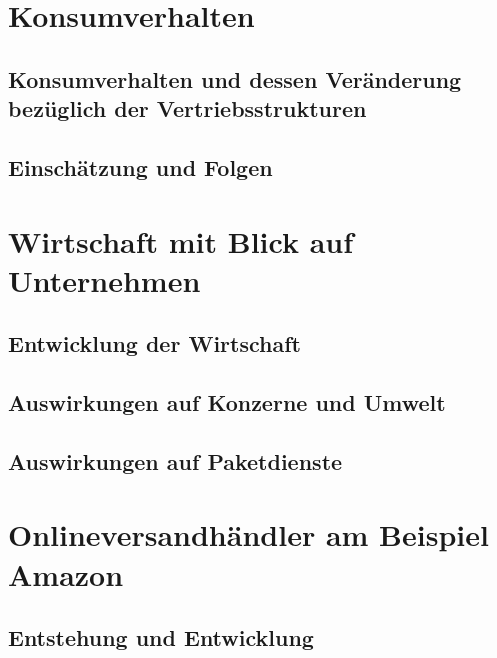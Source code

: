 \documentclass[a4paper, 12pt]{scrartcl}
\begin{document}
        
        
    \section{Konsumverhalten}
            
        \subsection{Konsumverhalten und dessen Veränderung bezüglich der Vertriebsstrukturen}
            
            
        \subsection{Einschätzung und Folgen}
            
        \newpage
            
            
            
    \section{Wirtschaft mit Blick auf Unternehmen}
            
        \subsection{Entwicklung der Wirtschaft}
        \subsection{Auswirkungen auf Konzerne und Umwelt}
        \subsection{Auswirkungen auf Paketdienste}
        \newpage
        
        
        
    \section{Onlineversandhändler am Beispiel Amazon} 
        
        \subsection{Entstehung und Entwicklung}
            
            
\end{document}
